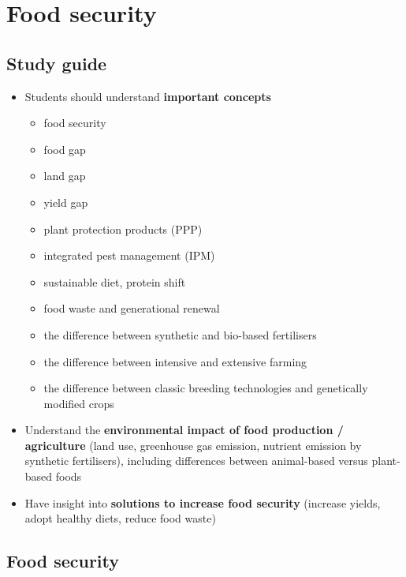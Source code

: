 \documentclass[../summary.tex]{subfiles}
\begin{document}
\section{Food security}

\subsection{Study guide}
\begin{itemize}
	\setlength{\itemsep}{0pt}
	\item Students should understand \textbf{important concepts}
	      \begin{itemize}
		      \item food security
		      \item food gap
		      \item land gap
		      \item yield gap
		      \item plant protection products (PPP)
		      \item integrated pest management (IPM)
		      \item sustainable diet, protein shift
		      \item food waste and generational renewal
		      \item the difference between synthetic and bio-based fertilisers
		      \item the difference between intensive and extensive farming
		      \item the difference between classic breeding technologies and genetically modified crops
	      \end{itemize}
	\item Understand the \textbf{environmental impact of food production / agriculture} (land use, greenhouse gas emission, nutrient emission by synthetic fertilisers), including differences between animal-based versus plant-based foods
	\item Have insight into \textbf{solutions to increase food security} (increase yields, adopt healthy diets, reduce food waste)
\end{itemize}

\subsection{Food security}
\end{document}
